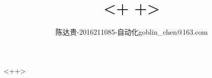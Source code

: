 \documentclass[UTF8,12pt]{ctexart}
\title{<+ +>}
\author{陈达贵-2016211085-自动化\quad goblin\_chen@163.com}
\begin{document}
\maketitle
<++>
\end{document}
